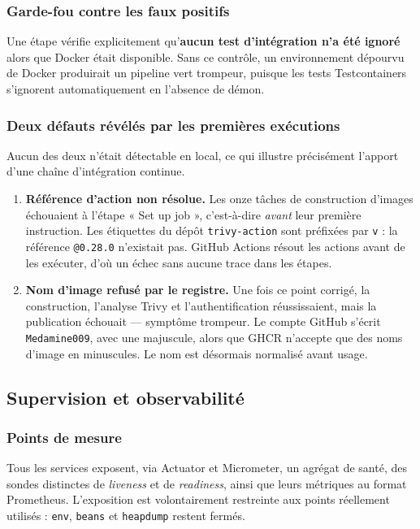 \subsubsection{Garde-fou contre les faux positifs}
Une étape vérifie explicitement qu'\textbf{aucun test d'intégration n'a été ignoré} alors
que Docker était disponible. Sans ce contrôle, un environnement dépourvu de Docker
produirait un pipeline vert trompeur, puisque les tests Testcontainers s'ignorent
automatiquement en l'absence de démon.

\subsubsection{Deux défauts révélés par les premières exécutions}
Aucun des deux n'était détectable en local, ce qui illustre précisément l'apport d'une
chaîne d'intégration continue.

\begin{enumerate}
  \item \textbf{Référence d'action non résolue.} Les onze tâches de construction d'images
        échouaient à l'étape « Set up job », c'est-à-dire \emph{avant} leur première
        instruction. Les étiquettes du dépôt \texttt{trivy-action} sont préfixées par
        \texttt{v} : la référence \texttt{@0.28.0} n'existait pas. GitHub Actions résout les
        actions avant de les exécuter, d'où un échec sans aucune trace dans les étapes.
  \item \textbf{Nom d'image refusé par le registre.} Une fois ce point corrigé, la
        construction, l'analyse Trivy et l'authentification réussissaient, mais la
        publication échouait — symptôme trompeur. Le compte GitHub s'écrit
        \texttt{Medamine009}, avec une majuscule, alors que GHCR n'accepte que des noms
        d'image en minuscules. Le nom est désormais normalisé avant usage.
\end{enumerate}

\subsection{Supervision et observabilité}

\subsubsection{Points de mesure}
Tous les services exposent, via Actuator et Micrometer, un agrégat de santé, des sondes
distinctes de \emph{liveness} et de \emph{readiness}, ainsi que leurs métriques au format
Prometheus. L'exposition est volontairement restreinte aux points réellement utilisés :
\texttt{env}, \texttt{beans} et \texttt{heapdump} restent fermés.


